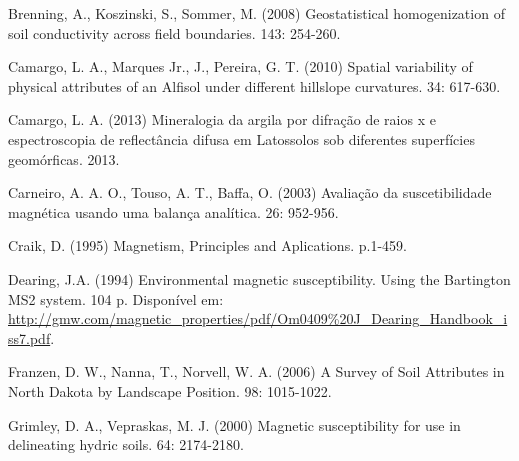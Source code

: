 \begin{footnotesize}
\begin{thebibliography}{99}




Brenning, A., Koszinski, S., Sommer, M. (2008)
\newblock Geostatistical homogenization of soil conductivity across field boundaries.
 143: 254-260.




Camargo, L. A., Marques Jr., J., Pereira, G. T. (2010)
\newblock Spatial variability of physical attributes of an Alfisol under different hillslope curvatures.
 34: 617-630.




Camargo, L. A. (2013)
\newblock Mineralogia da argila por difração de raios x e espectroscopia de reflectância difusa em Latossolos sob diferentes superfícies geomórficas.
 2013.




Carneiro, A. A. O., Touso, A. T., Baffa, O. (2003)
\newblock Avaliação da suscetibilidade magnética usando uma balança analítica.
 26: 952-956.




Craik, D. (1995)
\newblock Magnetism, Principles and Aplications.
 p.1-459.




Dearing, J.A. (1994)
\newblock Environmental magnetic susceptibility. Using the Bartington MS2 system.
 104 p. Disponível em: \url{http://gmw.com/magnetic\_properties/pdf/Om0409\%20J\_Dearing\_Handbook_iss7.pdf}.




Franzen, D. W., Nanna, T., Norvell, W. A. (2006)
\newblock A Survey of Soil Attributes in North Dakota by Landscape Position.
 98: 1015-1022.




Grimley, D. A., Vepraskas, M. J. (2000)
\newblock Magnetic susceptibility for use in delineating hydric soils.
 64: 2174-2180.





\end{thebibliography}
\end{footnotesize}
